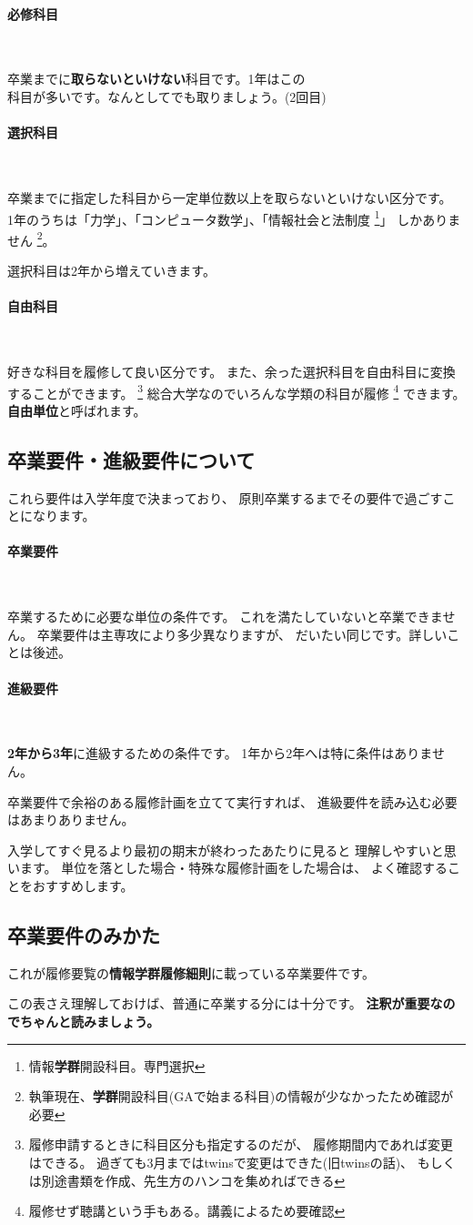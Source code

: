 \documentclass[a4j]{jsarticle}
\newcommand{\bold}[1]{{\bfseries #1}}
\newcommand{\parapara}[1]{\paragraph{#1}~\par}
\newcommand{\bparapara}[1]{\parapara{\bold{#1}}}
\begin{document}
\bparapara{必修科目}
卒業までに\bold{取らないといけない}科目です。1年はこの
\\科目が多いです。なんとしてでも取りましょう。(2回目)
\bparapara{選択科目}
卒業までに指定した科目から一定単位数以上を取らないといけない区分です。
\\1年のうちは「力学」、「コンピュータ数学」、「情報社会と法制度
\footnote{情報\bold{学群}開設科目。専門選択}」
しかありません
\footnote{執筆現在、\bold{学群}開設科目(GAで始まる科目)の情報が少なかったため確認が必要}。

選択科目は2年から増えていきます。
\bparapara{自由科目}
好きな科目を履修して良い区分です。
また、余った選択科目を自由科目に変換することができます。
\footnote{履修申請するときに科目区分も指定するのだが、
履修期間内であれば変更はできる。
過ぎても3月まではtwinsで変更はできた(旧twinsの話)、
もしくは別途書類を作成、先生方のハンコを集めればできる}
総合大学なのでいろんな学類の科目が履修
\footnote{履修せず聴講という手もある。講義によるため要確認}
できます。
\bold{自由単位}と呼ばれます。

\subsection{卒業要件・進級要件について}
\vspace{-2mm}
これら要件は入学年度で決まっており、
原則卒業するまでその要件で過ごすことになります。

\bparapara{卒業要件}
卒業するために必要な単位の条件です。
これを満たしていないと卒業できません。
卒業要件は主専攻により多少異なりますが、
だいたい同じです。詳しいことは後述。

\bparapara{進級要件}
\bold{2年から3年}に進級するための条件です。
1年から2年へは特に条件はありません。

卒業要件で余裕のある履修計画を立てて実行すれば、
進級要件を読み込む必要はあまりありません。

入学してすぐ見るより最初の期末が終わったあたりに見ると
理解しやすいと思います。
単位を落とした場合・特殊な履修計画をした場合は、
よく確認することをおすすめします。

\subsection{卒業要件のみかた}
\vspace{-2mm}
これが履修要覧の\bold{情報学群履修細則}に載っている卒業要件です。

この表さえ理解しておけば、普通に卒業する分には十分です。
\bold{注釈が重要なのでちゃんと読みましょう。}
\end{document}
